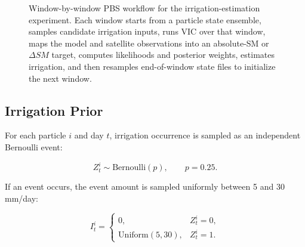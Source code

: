 \documentclass[11pt]{article}
\newcommand{\code}[1]{\texttt{#1}}
\begin{document}
\begin{figure}[H]
{%
}
\caption{Window-by-window PBS workflow for the irrigation-estimation experiment. Each window starts from a particle state ensemble, samples candidate irrigation inputs, runs VIC over that window, maps the model and satellite observations into an absolute-SM or $\Delta SM$ target, computes likelihoods and posterior weights, estimates irrigation, and then resamples end-of-window state files to initialize the next window.}
\label{fig:workflow}
\end{figure}

\subsection{Irrigation Prior}

For each particle $i$ and day $t$, irrigation occurrence is sampled as an independent Bernoulli event:

\begin{equation}
Z^i_t \sim \mathrm{Bernoulli}(p), \qquad p = 0.25.
\label{eq:event}
\end{equation}

If an event occurs, the event amount is sampled uniformly between 5 and 30 mm/day:

\begin{equation}
I^i_t =
\begin{cases}
0, & Z^i_t = 0,\\
\mathrm{Uniform}(5,30), & Z^i_t = 1.
\end{cases}
\label{eq:irrig_prior}
\end{equation}
\end{document}

